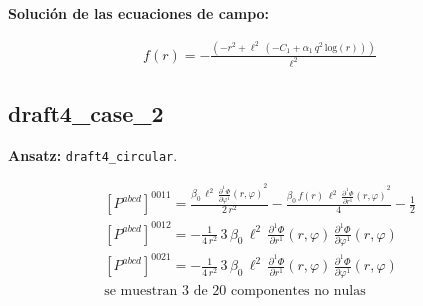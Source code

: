 \documentclass[10pt]{article}
\begin{document}
\noindent\textbf{Solución de las ecuaciones de campo:}\par
\[\begin{aligned}f\!\left(r\right)=-\frac{\left(-{r}^{2} + {\ell}^{2}\,\left(-C_{1} + \alpha_{1}\,{q}^{2}\,\mathrm{log}\!\left(r\right)\right)\right)}{{\ell}^{2}}\end{aligned}\]
\subsection*{draft4\_case\_2}
\textbf{Ansatz:} \texttt{draft4\_circular}.\par
\[\begin{aligned}\left[P^{abcd}\right]^{0011}=\frac{\beta_{0}\,{\ell}^{2}\,{\frac{\partial^{1} \Phi}{\partial \varphi^{1}}\!\left(r, \varphi\right)}^{2}}{2\,{r}^{2}} - \frac{\beta_{0}\,f\!\left(r\right)\,{\ell}^{2}\,{\frac{\partial^{1} \Phi}{\partial r^{1}}\!\left(r, \varphi\right)}^{2}}{4} - \frac{1}{2}\\[2pt]\left[P^{abcd}\right]^{0012}=-\frac{1}{4\,{r}^{2}}\,3\,\beta_{0}\,{\ell}^{2}\,\frac{\partial^{1} \Phi}{\partial r^{1}}\!\left(r, \varphi\right)\,\frac{\partial^{1} \Phi}{\partial \varphi^{1}}\!\left(r, \varphi\right)\\[2pt]\left[P^{abcd}\right]^{0021}=-\frac{1}{4\,{r}^{2}}\,3\,\beta_{0}\,{\ell}^{2}\,\frac{\partial^{1} \Phi}{\partial r^{1}}\!\left(r, \varphi\right)\,\frac{\partial^{1} \Phi}{\partial \varphi^{1}}\!\left(r, \varphi\right)\\[2pt]\text{se muestran 3 de 20 componentes no nulas}\end{aligned}\]
\end{document}

